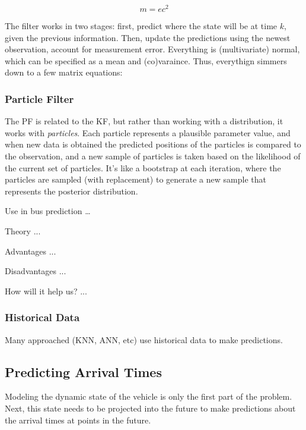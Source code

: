 \documentclass[12pt,a4paper]{article}
\begin{document}
\begin{equation}
  \label{eq:kalman_filter}
  m = ec^2
\end{equation}

The filter works in two stages: first, predict where the state will be at time $k$, given the previous information.
Then, update the predictions using the newest observation, account for measurement error.
Everything is (multivariate) normal, which can be specified as a mean and (co)varaince.
Thus, everythign simmers down to a few matrix equations:

\subsubsection{Particle Filter}
\label{sec:particle_filter}

The PF is related to the KF, but rather than working with a distribution, it works with \emph{particles}.
Each particle represents a plausible parameter value, and when new data is obtained the predicted positions of the
particles is compared to the observation, and a new sample of particles is taken based on the likelihood of the current set of particles.
It's like a bootstrap at each iteration, where the particles are sampled (with replacement) to generate a new sample that represents the posterior distribution.

Use in bus prediction \ldots \cite{chen-rakha:2014,hans-etal:2015}

Theory ... \cite{gordon-etal:1993,carpenter-etal:1999,gustafsson-etal:2002}

Advantages ...

Disadvantages ...

How will it help us? ...


\subsubsection{Historical Data}
\label{sec:historical_data}

Many approached (KNN, ANN, etc) use historical data to make predictions.


\subsection{Predicting Arrival Times}
\label{sec:predicting_arival_times}

Modeling the dynamic state of the vehicle is only the first part of the problem.
Next, this state needs to be projected into the future to make predictions about
the arrival times at points in the future.
\end{document}

